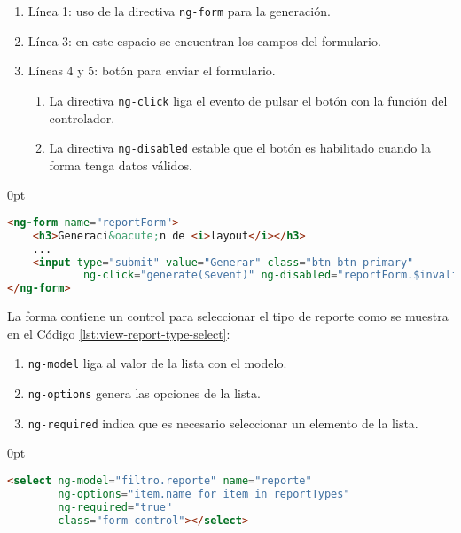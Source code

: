 \begin{enumerate}
\begin{enumerate}
	\item Línea 1: uso de la directiva \texttt{ng-form} para la generación.
	\item Línea 3: en este espacio se encuentran los campos del formulario.
	\item Líneas 4 y 5: botón para enviar el formulario.
	\begin{enumerate}
		\item La directiva \texttt{ng-click} liga el evento de pulsar el botón con la función del controlador.
		\item La directiva \texttt{ng-disabled} estable que el botón es habilitado cuando la forma tenga datos válidos.
	\end{enumerate}
\end{enumerate}

\begin{adjustwidth}{\listingfixwidth}{0pt}
\begin{lstlisting}[language=HTML, captionpos=b, caption={Forma de generación de reportes.}, label={lst:view-report-form}]
<ng-form name="reportForm">
	<h3>Generaci&oacute;n de <i>layout</i></h3>
	...
	<input type="submit" value="Generar" class="btn btn-primary"
			ng-click="generate($event)" ng-disabled="reportForm.$invalid"/>	
</ng-form>
\end{lstlisting}
\end{adjustwidth}

La forma contiene un control para seleccionar el tipo de reporte como se muestra en el Código \ref{lst:view-report-type-select}:
\begin{enumerate}
	\item \texttt{ng-model} liga al valor de la lista con el modelo.
	\item \texttt{ng-options} genera las opciones de la lista.
	\item \texttt{ng-required} indica que es necesario seleccionar un elemento de la lista.
\end{enumerate}

\begin{adjustwidth}{\listingfixwidth}{0pt}
\begin{lstlisting}[language=HTML, captionpos=b, caption={Lista para seleccionar el tipo de reporte.}, label={lst:view-report-type-select}]
<select ng-model="filtro.reporte" name="reporte"
		ng-options="item.name for item in reportTypes"
		ng-required="true"
		class="form-control"></select>
\end{lstlisting}
\end{adjustwidth}


\end{enumerate}

